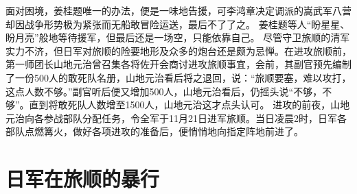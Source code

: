 \documentclass[12pt,UTF8]{ctexbook}
\begin{document}
面对困境，姜桂题唯一的办法，便是一味地告援，可李鸿章决定调派的嵩武军八营却因战争形势极为紧张而无船敢冒险运送，最后不了了之。
姜桂题等人“盼星星、盼月亮”般地等待援军，但最后还是一场空，只能依靠自己。
尽管守卫旅顺的清军实力不济，但日军对旅顺的险要地形及众多的炮台还是颇为忌惮。在进攻旅顺前，第一师团长山地元治曾召集各将佐开会商讨进攻旅顺事宜，会前，其副官预先编制了一份500人的敢死队名册，山地元治看后将之退回，说：“旅顺要塞，难以攻打，这点人数不够。”副官听后便又增加500人，山地元治看后，仍摇头说“不够，不够”。直到将敢死队人数增至1500人，山地元治这才点头认可。
进攻的前夜，山地元治向各参战部队分配任务，令全军于11月21日进军旅顺。当日凌晨2时，日军各部队点燃篝火，做好各项进攻的准备后，便悄悄地向指定阵地前进了。


\chapter{日军在旅顺的暴行}
\end{document}
